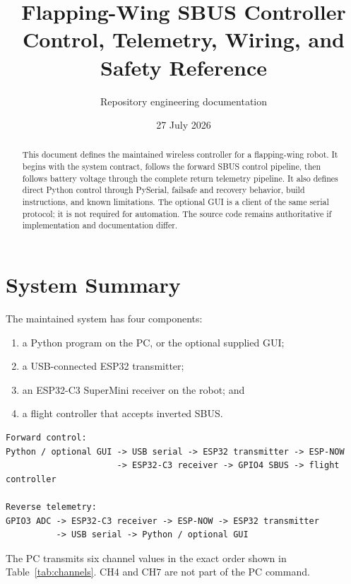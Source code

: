 \documentclass[11pt,a4paper]{article}
\title{Flapping-Wing SBUS Controller\\
       \large Control, Telemetry, Wiring, and Safety Reference}
\author{Repository engineering documentation}
\date{27 July 2026}
\begin{document}
\maketitle

\begin{abstract}
This document defines the maintained wireless controller for a flapping-wing
robot. It begins with the system contract, follows the forward SBUS control
pipeline, then follows battery voltage through the complete return telemetry
pipeline. It also defines direct Python control through PySerial, failsafe and
recovery behavior, build instructions, and known limitations. The optional GUI
is a client of the same serial protocol; it is not required for automation. The
source code remains authoritative if implementation and documentation differ.
\end{abstract}

\tableofcontents
\clearpage

\section{System Summary}

The maintained system has four components:

\begin{enumerate}
  \item a Python program on the PC, or the optional supplied GUI;
  \item a USB-connected ESP32 transmitter;
  \item an ESP32-C3 SuperMini receiver on the robot; and
  \item a flight controller that accepts inverted SBUS.
\end{enumerate}

\begin{lstlisting}
Forward control:
Python / optional GUI -> USB serial -> ESP32 transmitter -> ESP-NOW
                      -> ESP32-C3 receiver -> GPIO4 SBUS -> flight controller

Reverse telemetry:
GPIO3 ADC -> ESP32-C3 receiver -> ESP-NOW -> ESP32 transmitter
          -> USB serial -> Python / optional GUI
\end{lstlisting}

The PC transmits six channel values in the exact order shown in
Table~\ref{tab:channels}. CH4 and CH7 are not part of the PC command.
\end{document}
